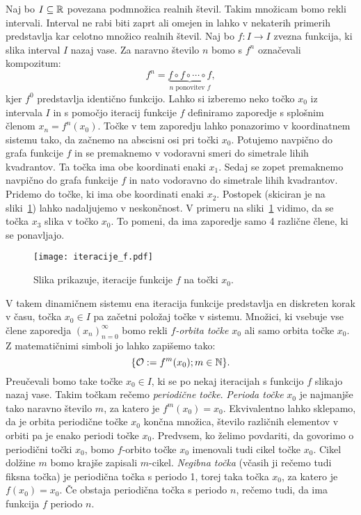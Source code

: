 \documentclass[../TG_magistrsko_delo_sections.tex]{subfiles}
\begin{document}
Naj bo $I\subseteq \mathbb R$ povezana podmnožica realnih števil. Takim množicam bomo rekli intervali. Interval ne rabi biti zaprt ali omejen in lahko v nekaterih primerih predstavlja kar celotno množico realnih števil. Naj bo $f:I \to I$ zvezna funkcija, ki slika interval $I$ nazaj vase. Za naravno število $n$ bomo s $f^n$ označevali kompozitum:
$$f^n = \underbrace{f \circ f \circ \cdots \circ f}_{n \text{ ponovitev } f},$$
kjer $f^0$ predstavlja identično funkcijo. Lahko si izberemo neko točko $x_0$ iz intervala $I$ in s pomočjo iteracij funkcije $f$ definiramo zaporedje s splošnim členom $x_n = f^n(x_0)$. Točke v tem zaporedju lahko ponazorimo v koordinatnem sistemu tako, da začnemo na abscisni osi pri točki $x_0$. Potujemo navpično do grafa funkcije $f$ in se premaknemo v vodoravni smeri do simetrale lihih kvadrantov. Ta točka ima obe koordinati enaki $x_1$. Sedaj se zopet premaknemo navpično do grafa funkcije $f$ in nato vodoravno do simetrale lihih kvadrantov. Pridemo do točke, ki ima obe koordinati enaki $x_2$. Postopek (skiciran je na sliki~\ref{fig:iteracije}) lahko nadaljujemo v neskončnost. V primeru na sliki~\ref{fig:iteracije} vidimo, da se točka $x_3$ slika v točko $x_0$. To pomeni, da ima zaporedje samo 4 različne člene, ki se ponavljajo.

\begin{figure}[h]
  \centering
  \texttt{[image: iteracije\_f.pdf]}
  \caption[Primer vektorske slike.]{Slika prikazuje, iteracije funkcije $f$ na točki $x_0$.}
  \label{fig:iteracije}
\end{figure}

V takem dinamičnem sistemu ena iteracija funkcije predstavlja en diskreten korak v času, točka $x_0 \in I$ pa začetni položaj točke v sistemu. Množici, ki vsebuje vse člene zaporedja $\left( x_n \right)_{n=0}^{\infty}$ bomo rekli \emph{$f$-orbita točke $x_0$} ali samo orbita točke $x_0$. Z matematičnimi simboli jo lahko zapišemo tako:
$$\{ \mathcal{O} := f^m(x_0) ; m \in \mathbb N \}.$$
Preučevali bomo take točke $x_0 \in I$, ki se po nekaj iteracijah s funkcijo $f$ slikajo nazaj vase. Takim točkam rečemo \emph{periodične točke}. \emph{Perioda točke} $x_0$ je najmanjše tako naravno število $m$, za katero je $f^m(x_0) = x_0$. Ekvivalentno lahko sklepamo, da je orbita periodične točke $x_0$ končna množica, število različnih elementov v orbiti pa je enako periodi točke $x_0$. Predvsem, ko želimo povdariti, da govorimo o periodični točki $x_0$, bomo $f$-orbito točke $x_0$ imenovali tudi cikel točke $x_0$. Cikel dolžine $m$ bomo krajše zapisali $m$-cikel. \emph{Negibna točka} (včasih ji rečemo tudi fiksna točka) je periodična točka s periodo 1, torej taka točka $x_0$, za katero je $f(x_0) = x_0$. Če obstaja periodična točka s periodo $n$, rečemo tudi, da ima funkcija $f$ periodo $n$.
\end{document}
